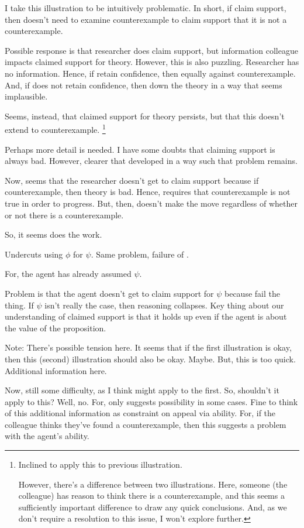 \begin{note}
\begin{illustration}
    I take this illustration to be intuitively problematic.
    In short, if claim support, then doesn't need to examine counterexample to claim support that it is not a counterexample.

    Possible response is that researcher does claim support, but information colleague impacts claimed support for theory.
    However, this is also puzzling.
    Researcher has no information.
    Hence, if retain confidence, then equally against counterexample.
    And, if does not retain confidence, then down the theory in a way that seems implausible.

    Seems, instead, that claimed support for theory persists, but that this doesn't extend to counterexample.\nolinebreak
    \footnote{
      Inclined to apply this to previous illustration.

      However, there's a difference between two illustrations.
      Here, someone (the colleague) has reason to think there is a counterexample, and this seems a sufficiently important difference to draw any quick conclusions.
      And, as we don't require a resolution to this issue, I won't explore further.
    }

    Perhaps more detail is needed.
    I have some doubts that claiming support is always bad.
    However, clearer that developed in a way such that problem remains.

    Now, seems that the researcher doesn't get to claim support because if counterexample, then theory is bad.
    Hence, requires that counterexample is not true in order to progress.
    But, then, doesn't make the move regardless of whether or not there is a counterexample.

    So, it seems \eiS{} does the work.
  \end{illustration}

  Undercuts using \(\phi\) for \(\psi\).
  Same problem, failure of \eiS{}.

  For, the agent has already assumed \(\psi\).

  Problem is that the agent doesn't get to claim support for \(\psi\) because fail the \eiS{} thing.
  If \(\psi\) isn't really the case, then reasoning collapses.
  Key thing about our understanding of claimed support is that it holds up even if the agent is \mom{} about the value of the proposition.

  {
    \color{red}
    Note:
    There's possible tension here.
    It seems that if the first illustration is okay, then this (second) illustration should also be okay.
    Maybe.
    But, this is too quick.
    Additional information here.

    Now, still some difficulty, as I think \EAS{} might apply to the first.
    So, shouldn't it apply to this?
    Well, no.
    For, \EAS{} only suggests possibility in some cases.
    Fine to think of this additional information as constraint on appeal via ability.
    For, if the colleague thinks they've found a counterexample, then this suggests a problem with the agent's ability.
  }
\end{note}

